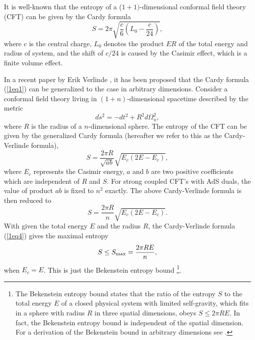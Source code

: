 \documentclass[a4paper,12pt]{article}
\begin{document}
It is well-known that the entropy of a ($1+1)$-dimensional conformal field 
theory (CFT) can be given by the Cardy formula \cite{Card}
\begin{equation}
\label{1eq1}
S=2\pi \sqrt{\frac{c}{6}\left (L_0-\frac{c}{24}\right )},
\end{equation}
where $c$ is the central charge, $L_0$ denotes the product $ER$ of the 
total energy and radius of system, and the shift of $c/24$ is caused by the
Casimir effect, which is a finite volume effect.

In a recent paper by Erik Verlinde \cite{Verl}, it has been proposed that the
Cardy formula (\ref{1eq1}) can be generalized to the case in arbitrary 
dimensions.  Consider a conformal field theory living in $(1+n)$-dimensional 
spacetime described by the metric
\begin{equation}
\label{1eq2}
ds^2 = -dt^2 +R^2d\Omega_n^2,
\end{equation}
where $R$ is the radius of a $n$-dimensional sphere. The entropy of the CFT
can be given by the generalized Cardy formula (hereafter we refer to this as 
the Cardy-Verlinde formula),
\begin{equation}
\label{1eq3}
S= \frac{2\pi R}{\sqrt{ab}} \sqrt{E_c(2E-E_c)},
\end{equation}
where $E_c$ represents the Casimir energy,  $a$ and $b$ are two positive
coefficients which are independent of $R$ and $S$. For strong coupled
CFT's with AdS duals, the value of product $ab$ is fixed to $n^2$ exactly.
The above Cardy-Verlinde formula is then reduced to
\begin{equation}
\label{1eq4}
S=\frac{2\pi R}{n}\sqrt{E_c(2E-E_c)}.
\end{equation}
With given the total energy $E$ and the radius $R$, the Cardy-Verlinde
formula (\ref{1eq4}) gives the maximal entropy
\begin{equation}
S \le S_{\rm max}=\frac{2\pi R E}{n},
\end{equation}
when $E_c=E$. 
This is just the Bekenstein entropy bound \cite{Beke}\footnote{ The Bekenstein
entropy bound states that  the ratio of the entropy $S$ to the total energy
$E$ of a closed physical system with limited self-gravity, which fits in a 
sphere with radius $R$ in three spatial dimensions, obeys $S \le 2\pi R E$. 
In fact, the Bekenstein entropy bound is independent of  the spatial 
dimension. For a derivation of the Bekenstein bound in arbitrary dimensions 
see \cite{Bous}.}.   
  
\end{document}
